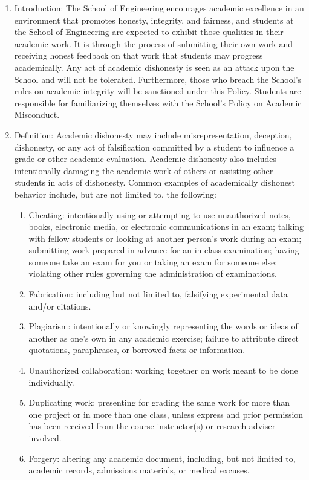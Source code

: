 \documentclass[10pt]{article}
\begin{document}
\begin{enumerate}[label=\Alph*.]\itemsep0em 

\item Introduction: The School of Engineering encourages academic excellence in an environment that promotes honesty, integrity, and fairness, and students at the School of Engineering are expected to exhibit those qualities in their academic work. It is through the process of submitting their own work and receiving honest feedback on that work that students may progress academically. Any act of academic dishonesty is seen as an attack upon the School and will not be tolerated. Furthermore, those who breach the School’s rules on academic integrity will be sanctioned under this Policy. Students are responsible for familiarizing themselves with the School’s Policy on Academic Misconduct.

\item	Definition: Academic dishonesty may include misrepresentation, deception, dishonesty, or any act of falsification committed by a student to influence a grade or other academic evaluation. Academic dishonesty also includes intentionally damaging the academic work of others or assisting other students in acts of dishonesty. Common examples of academically dishonest behavior include, but are not limited to, the following:
\begin{enumerate}[label=\arabic*.]\itemsep0em 
	\item	Cheating: intentionally using or attempting to use unauthorized notes, books, electronic media, or electronic communications in an exam; talking with fellow students or looking at another person’s work during an exam; submitting work prepared in advance for an in-class examination; having someone take an exam for you or taking an exam for someone else; violating other rules governing the administration of examinations.
	\item	Fabrication:  including but not limited to, falsifying experimental data and/or citations.
	\item	Plagiarism: intentionally or knowingly representing the words or ideas of another as one’s own in any academic exercise; failure to attribute direct quotations, paraphrases, or borrowed facts or information. 
	\item	Unauthorized collaboration: working together on work meant to be done individually.
	\item	Duplicating work: presenting for grading the same work for more than one project or in more than one class, unless express and prior permission has been received from the course instructor(s) or research adviser involved. 
	\item	Forgery: altering any academic document, including, but not limited to, academic records, admissions materials, or medical excuses.
\end{enumerate}
\end{enumerate}
\end{document}
